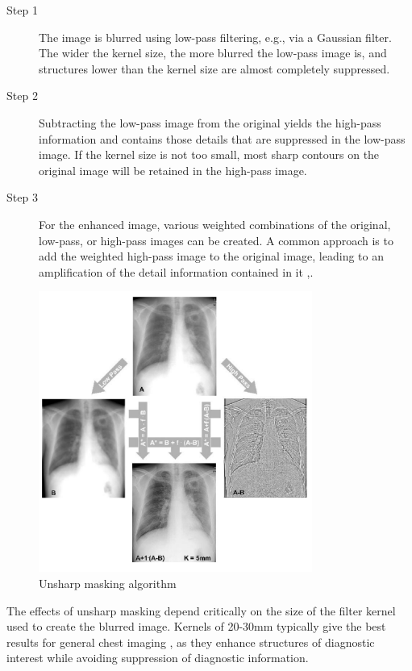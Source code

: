 \documentclass[nomenclature, english, bibtex]{kththesis}
\numberwithin{listing}{chapter}
\begin{document}
\begin{description}
    \item[Step 1] The image is blurred using low-pass filtering, e.g., via a Gaussian filter. The wider the kernel size,
    the more blurred the low-pass image is, and structures lower than the kernel size are almost completely suppressed.
    \item[Step 2] Subtracting the low-pass image from the original yields the high-pass information and contains those
    details that are suppressed in the low-pass image. If the kernel size is not too small, most sharp contours on the
    original image will be retained in the high-pass image.
    \item[Step 3] For the enhanced image, various weighted combinations of the original, low-pass, or high-pass images
    can be created. A common approach is to add the weighted high-pass image to the original image, leading to an
    amplification of the detail information contained in it \cite[p.~152-153]{Prokop2003},.
\end{description}

\begin{figure}
    \centering
    \includegraphics[width=0.8\textwidth]{figures/unsharp_mask.png}
    \caption{Unsharp masking algorithm \cite[Figure~5]{Prokop2003}}
    \label{fig:unsharp_masking}
\end{figure}

The effects of unsharp masking depend critically on the size of the filter kernel used to create the blurred image.
Kernels of 20-30mm typically give the best results for general chest imaging \cite[p.~153]{Prokop2003},
as they enhance structures of diagnostic interest while avoiding suppression of diagnostic information.
\end{document}
